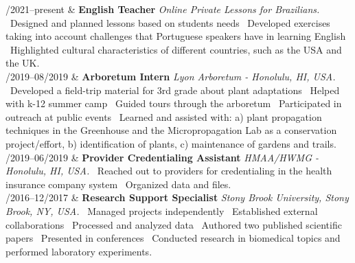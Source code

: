 \documentclass[11pt, a4paper]{article}
\newcommand{\Duration}[2]{\fontsize{10pt}{0}\selectfont #1--#2}
\begin{document}
\begin{EntriesTable}
	
	\Duration{02/2021}{present}  &
	\textbf{English Teacher}
	\newline
	\textit{Online Private Lessons for Brazilians.}
	\newline
	\textbullet \ Designed and planned lessons based on students needs 
	\textbullet \ Developed exercises taking into account challenges that
	Portuguese speakers have in learning English
	\textbullet \ Highlighted cultural characteristics of different countries,
	such as the USA and the UK.
		\\
	
	\Duration{06/2019}{08/2019}  &
	\textbf{Arboretum Intern}
	\newline
	\textit{Lyon Arboretum - Honolulu, HI, USA.}
	\newline
	\textbullet \ Developed a field-trip material for 3rd grade about plant adaptations 
	\textbullet \ Helped with k-12 summer camp 
	\textbullet \ Guided tours through the arboretum 
	\textbullet \ Participated in outreach at public events 
	\textbullet \ Learned and assisted with: a) plant propagation techniques in the Greenhouse and
	the Micropropagation Lab as a conservation project/effort, b) identification of plants, c) 
	maintenance of gardens and trails.
	\\
	
	\Duration{03/2019}{06/2019}  &
	\textbf{Provider Credentialing Assistant}
	\newline
	\textit{HMAA/HWMG - Honolulu, HI, USA.}
	\newline
	\textbullet \ Reached out to providers for credentialing in the health insurance company system 
	\textbullet \ Organized data and files.
	\\
	
	\Duration{08/2016}{12/2017}  &
	\textbf{Research Support Specialist}
	\newline
	\textit{Stony Brook University, Stony Brook, NY, USA.}
	\newline   
	\textbullet \ Managed projects independently 
	\textbullet \ Established external collaborations 
	\textbullet \ Processed and analyzed data 
	\textbullet \ Authored two published scientific papers 
	\textbullet \ Presented in conferences 
	\textbullet\ Conducted research in biomedical topics and performed laboratory experiments. 
	\\
	
\end{EntriesTable}
\end{document}
